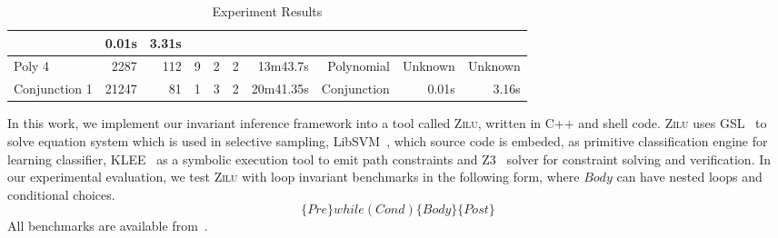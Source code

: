 \begin{table*}[t]
\begin{center}
\begin{center}
\begin{adjustbox}{max width=1\textwidth}
\begin{tabular}{l | r | r | r | r | r | r | r | r | r}
            & 0.01s & 3.31s 
            \\
        \hline
        Poly 4 
            & 2287 & 112 & 9
            & 2 & 2
            & 13m43.7s & Polynomial
            & Unknown & Unknown 
            \\
        \hline
        Conjunction 1
            & 21247 & 81 & 1 
            & 3 & 2 
            & 20m41.35s & Conjunction
            & 0.01s & 3.16s
            \\
        \hline
    \end{tabular}
    \end{adjustbox}
    \end{center}
    \end{center}
    \caption{Experiment Results}
    \label{tab:experiments}
\end{table*}

In this work, we implement our invariant inference framework into a tool called \textsc{Zilu}, 
written in C++ and shell code. 
\textsc{Zilu} uses GSL~\cite{gough2009gnu} to solve equation system which is used in selective sampling, 
LibSVM~\cite{chang2011libsvm}, which source code is embeded, as primitive classification engine for learning classifier, 
KLEE~\cite{cadar2008klee} as a symbolic execution tool to emit path constraints 
and Z3~\cite{de2008z3} solver for constraint solving and verification. 
In our experimental evaluation, 
we test \textsc{Zilu} with  loop invariant benchmarks 
in the following form, where $\mathit{Body}$ can have nested loops and conditional choices. 
\[
   \{ \mathit{Pre} \} \mathit{while}(\mathit{Cond}) \{ \mathit{Body} \} \{ \mathit{Post} \}
\]
All benchmarks are available from~\cite{zilu}. 

